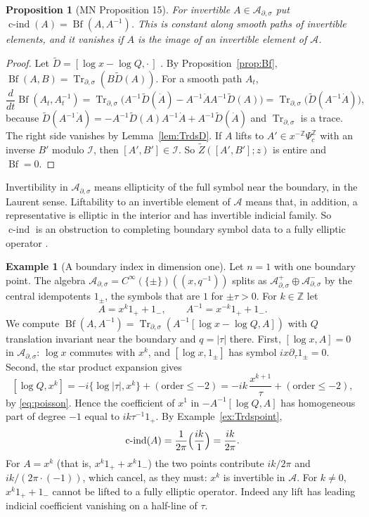 \documentclass[11pt,oneside,reqno]{article}
\DeclareMathOperator{\Tr}{Tr}
\DeclareMathOperator{\Bf}{Bf}
\newcommand{\Z}{\mathbb Z}
\newcommand{\cA}{\mathcal A}
\newcommand{\cI}{\mathcal I}
\newcommand{\Ads}{\mathcal A_{\partial,\sigma}}
\newcommand{\Psic}{\Psi_{c}}
\newcommand{\Trds}{\Tr_{\partial,\sigma}}
\newcommand{\CI}{C^\infty}
\newcommand{\lQ}{\log Q}
\newcommand{\lx}{\log x}
\theoremstyle{plain}
\newtheorem{proposition}[theorem]{Proposition}
\theoremstyle{definition}
\newtheorem{example}[theorem]{Example}
\theoremstyle{remark}
\newcommand{\Lser}[1]{(\!(#1)\!)}
\begin{document}
\begin{proposition}[MN Proposition 15]\label{prop:cind}
For invertible \(A\in\Ads\) put \(\operatorname{c-ind}(A)=\Bf(A,A^{-1})\).
This is constant along smooth paths of invertible elements, and it
vanishes if \(A\) is the image of an invertible element of \(\cA\).
\end{proposition}

\begin{proof}
Let \(\widetilde D=[\lx-\lQ,\cdot\,]\) \cite[(83)]{MN}. By
Proposition~\ref{prop:Bf}, \(\Bf(A,B)=\Trds(B\widetilde D(A))\). For a
smooth path \(A_t\),
\[
 \frac d{dt}\Bf(A_t,A_t^{-1})=\Trds\bigl(A^{-1}\widetilde D(\dot A)
 -A^{-1}\dot AA^{-1}\widetilde D(A)\bigr)=\Trds\bigl(\widetilde D(A^{-1}
 \dot A)\bigr),
\]
because \(\widetilde D(A^{-1}\dot A)=-A^{-1}\widetilde D(A)A^{-1}\dot A+
A^{-1}\widetilde D(\dot A)\) and \(\Trds\) is a trace. The right side
vanishes by Lemma~\ref{lem:TrdsD}. If \(A\) lifts to \(A'\in x^{-\Z}
\Psic^{\Z}\) with an inverse \(B'\) modulo \(\cI\), then \([A',B']\in\cI\).
So \(\widetilde Z([A',B'];z)\) is entire and \(\Bf=0\).
\end{proof}

Invertibility in \(\Ads\) means ellipticity of the full symbol near the
boundary, in the Laurent sense. Liftability to an invertible element of
\(\cA\) means that, in addition, a representative is elliptic in the
interior and has invertible indicial family. So \(\operatorname{c-ind}\)
is an obstruction to completing boundary symbol data to a fully elliptic
operator \cite[Prop.~15]{MN}.

\begin{example}[A boundary index in dimension one]\label{ex:bindex}
Let \(n=1\) with one boundary point. The algebra \(\Ads=\CI(\{\pm\})
\Lser{x,q^{-1}}\) splits as \(\Ads^+\oplus\Ads^-\) by the central idempotents
\(1_\pm\), the symbols that are \(1\) for \(\pm\tau>0\). For \(k\in\Z\) let
\[
 A=x^k1_++1_-,\qquad A^{-1}=x^{-k}1_++1_- .
\]
We compute \(\Bf(A,A^{-1})=\Trds(A^{-1}[\lx-\lQ,A])\) with \(Q\)
translation invariant near the boundary and \(q=|\tau|\) there. First,
\([\lx,A]=0\) in \(\Ads\): \(\lx\) commutes with \(x^k\), and
\([\lx,1_\pm]\) has symbol \(ix\partial_\tau1_\pm=0\). Second, the star
product expansion gives
\[
 [\lQ,x^k]=-i\{\log|\tau|,x^k\}+(\text{order}\le-2)=-ik\,\frac{x^{k+1}}\tau
 +(\text{order}\le-2),
\]
by \eqref{eq:poisson}. Hence the coefficient of \(x^1\) in
\(-A^{-1}[\lQ,A]\) has homogeneous part of degree \(-1\) equal to
\(ik\tau^{-1}1_+\). By Example~\ref{ex:Trdspoint},
\[
 \operatorname{c-ind}(A)=\frac1{2\pi}\Bigl(\frac{ik}{1}\Bigr)=
 \frac{ik}{2\pi} .
\]
For \(A=x^k\) (that is, \(x^k1_++x^k1_-\)) the two points contribute
\(ik/2\pi\) and \(ik/(2\pi\cdot(-1))\), which cancel, as they must: \(x^k\)
is invertible in \(\cA\). For \(k\ne0\), \(x^k1_++1_-\) cannot be lifted to
a fully elliptic operator. Indeed any lift has leading indicial
coefficient vanishing on a half-line of \(\tau\).
\end{example}
\end{document}
